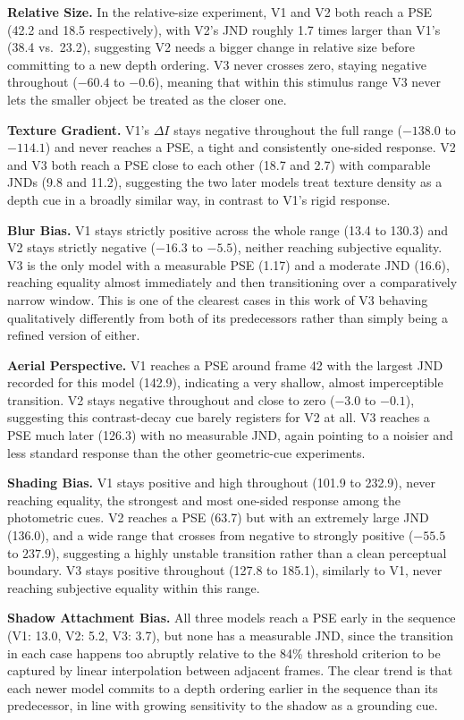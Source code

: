 \documentclass[10pt,twocolumn]{article}
\begin{document}
\textbf{Relative Size.} In the relative-size experiment, V1 and V2 both
reach a PSE (42.2 and 18.5 respectively), with V2's JND roughly 1.7 times larger than
V1's (38.4 vs.\ 23.2), suggesting V2 needs a bigger change in relative size before
committing to a new depth ordering. V3 never crosses zero, staying negative throughout
($-60.4$ to $-0.6$), meaning that within this stimulus range V3 never lets the smaller
object be treated as the closer one. 

\textbf{Texture Gradient.} V1's $\Delta I$ stays negative throughout the full range
($-138.0$ to $-114.1$) and never reaches a PSE, a tight and consistently one-sided
response. V2 and V3 both reach a PSE close to each other (18.7 and 2.7) with comparable
JNDs (9.8 and 11.2), suggesting the two later models treat texture density as a depth
cue in a broadly similar way, in contrast to V1's rigid response.

\textbf{Blur Bias.} V1 stays strictly positive across the whole range (13.4 to 130.3) and
V2 stays strictly negative ($-16.3$ to $-5.5$), neither reaching subjective equality. V3
is the only model with a measurable PSE (1.17) and a moderate JND (16.6), reaching
equality almost immediately and then transitioning over a comparatively narrow window.
This is one of the clearest cases in this work of V3 behaving qualitatively differently
from both of its predecessors rather than simply being a refined version of either.

\textbf{Aerial Perspective.} V1 reaches a PSE around frame 42 with the largest JND
recorded for this model (142.9), indicating a very shallow, almost imperceptible
transition. V2 stays negative throughout and close to zero ($-3.0$ to $-0.1$), suggesting
this contrast-decay cue barely registers for V2 at all. V3 reaches a PSE much later
(126.3) with no measurable JND, again pointing to a noisier and less standard response
than the other geometric-cue experiments.

\textbf{Shading Bias.} V1 stays positive and high throughout (101.9 to 232.9), never
reaching equality, the strongest and most one-sided response among the photometric
cues. V2 reaches a PSE (63.7) but with an extremely large JND (136.0), and a wide range
that crosses from negative to strongly positive ($-55.5$ to $237.9$), suggesting a highly
unstable transition rather than a clean perceptual boundary. V3 stays positive throughout
(127.8 to 185.1), similarly to V1, never reaching subjective equality within this range.

\textbf{Shadow Attachment Bias.} All three models reach a PSE early in the sequence (V1:
13.0, V2: 5.2, V3: 3.7), but none has a measurable JND, since the transition in each case
happens too abruptly relative to the 84\% threshold criterion to be captured by linear
interpolation between adjacent frames. The clear trend is that each newer model commits
to a depth ordering earlier in the sequence than its predecessor, in line with growing
sensitivity to the shadow as a grounding cue.
\end{document}
